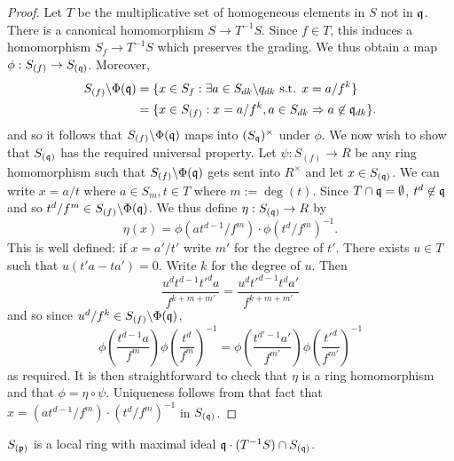 \documentclass{memoir}
\begin{document}
\begin{proof}
    Let $T$ be the multiplicative set of homogeneous elements in $S$ not in $\mathfrak{q}$.
    There is a canonical homomorphism $S\to T^{-1}S$.
    Since $f\in T$, this induces a homomorphism $S_f\to T^{-1}S$ which preserves the grading.
    We thus obtain a map $\phi:S_{(f)}\to S_{(\mathfrak{q})}$.
    Moreover,
    \begin{align}
        S_{(f)}\backslash \Phi(\mathfrak{q}) &= \lbrace x\in S_f: \exists a\in S_{dk}\backslash q_{dk} \text{ s.t. } x=a/f^k\rbrace \nonumber \\
                                      &= \lbrace x\in S_{(f)}: x=a/f^k, a\in S_{dk} \Rightarrow a\not\in \mathfrak{q}_{dk}\rbrace.
    \end{align}
    and so it follows that $S_{(f)}\backslash \Phi(\mathfrak{q})$ maps into $(S_{\mathfrak{q}})^\times$ under $\phi$.
    We now wish to show that $S_{(\mathfrak{q})}$ has the required universal property.
    Let $\psi:S_{(f)}\to R$ be any ring homomorphism such that $S_{(f)}\backslash\Phi(\mathfrak{q})$ gets sent into $R^\times$ and let $x\in S_{(\mathfrak{q})}$.
    We can write $x = a/t$ where $a\in S_m, t\in T$ where $m:= \deg(t)$.
    Since $T\cap \mathfrak{q} = \emptyset$, $t^d\not\in \mathfrak{q}$ and so $t^d/f^m\in S_{(f)}\backslash\Phi(\mathfrak{q})$.
    We thus define $\eta:S_{(\mathfrak{q})}\to R$ by
    \begin{equation}
         \eta(x) = \phi(at^{d-1}/f^m)\cdot\phi(t^d/f^m)^{-1}.
    \end{equation}
    This is well defined: if $x = a'/t'$ write $m'$ for the degree of $t'$.
    There exists $u\in T$ such that $u(t'a-ta') = 0$.
    Write $k$ for the degree of $u$.
    Then
    \begin{equation}
        \frac{u^dt^{d-1}t'^da}{f^{k+m+m'}} = \frac{u^dt'^{d-1}t^da'}{f^{k+m+m'}}
    \end{equation}
    and so since $u^d/f^k\in S_{(f)}\backslash \Phi(\mathfrak{q})$,
    \begin{equation}
        \phi\left(\frac{t^{d-1}a}{f^{m}}\right)\phi\left(\frac{t^d}{f^{m}}\right)^{-1} = \phi\left(\frac{t^{d'-1}a'}{f^{m'}}\right)\phi\left(\frac{t'^d}{f^{m'}}\right)^{-1}
    \end{equation}
    as required.
    It is then straightforward to check that $\eta$ is a ring homomorphism and that $\phi = \eta\circ\psi$.
    Uniqueness follows from that fact that $x = (at^{d-1}/f^m)\cdot(t^d/f^m)^{-1}$ in $S_{(\mathfrak{q})}$.
\end{proof}
\begin{corollary}
    $S_{(\mathfrak{p})}$ is a local ring with maximal ideal $\mathfrak{q} \cdot (T^{-1}S)\cap S_{(\mathfrak{q})}$.
\end{corollary}
\end{document}
